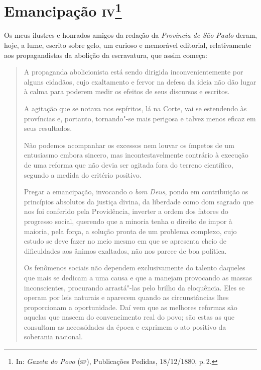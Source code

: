 \chapter{Emancipação \textsc{iv}\footnote[*]{In: \emph{Gazeta do Povo} (\textsc{sp}), Publicações Pedidas, 18/12/1880, p.\,2.}} %


Os meus ilustres e honrados amigos da redação da \emph{Província de São
Paulo} deram, hoje, a lume, escrito sobre gelo, um curioso e memorável
editorial, relativamente aos propagandistas da abolição da escravatura,
que assim começa:

\begin{quote}
A propaganda abolicionista está sendo dirigida inconvenientemente por
alguns cidadãos, cujo exaltamento e fervor na defesa da ideia não dão
lugar à calma para poderem medir os efeitos de seus discursos e
escritos.

A agitação que se notava nos espíritos, lá na Corte, vai se estendendo
às províncias e, portanto, tornando"-se mais perigosa e talvez menos
eficaz em seus resultados.

Não podemos acompanhar os excessos nem louvar os ímpetos de um
entusiasmo embora sincero, mas incontestavelmente contrário à execução
de uma reforma que não devia ser agitada fora do terreno científico,
segundo a medida do critério positivo.

Pregar a emancipação, invocando o \emph{bom Deus}, pondo em contribuição
os princípios absolutos da justiça divina, da liberdade como dom sagrado
que nos foi conferido pela Providência, inverter a ordem dos fatores do
progresso social, querendo que a minoria tenha o direito de impor à
maioria, pela força, a solução pronta de um problema complexo, cujo
estudo se deve fazer no meio mesmo em que se apresenta cheio de
dificuldades aos ânimos exaltados, não nos parece de boa política.

Os fenômenos sociais não dependem exclusivamente do talento daqueles que
mais se dedicam a uma causa e que a manejam provocando as massas
inconscientes, procurando arrastá"-las pelo brilho da eloquência. Eles se
operam por leis naturais e aparecem quando as circunstâncias lhes
proporcionam a oportunidade. Daí vem que as melhores reformas são
aquelas que nascem do convencimento real do povo; são estas as que
consultam as necessidades da época e exprimem o ato positivo da
soberania nacional.
\end{quote}

\noindent\dotfill{}

